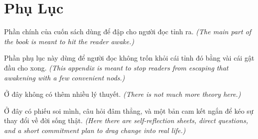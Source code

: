 \chapter*{Phụ Lục}

\begin{tcolorbox}[colback=booksoft!45,colframe=booksecondary,arc=4pt,boxrule=0.6pt,title={\bfseries Phụ Lục Này Dùng Để Làm Gì?},fonttitle=\bfseries\color{booksecondary}]
Phần chính của cuốn sách dùng để đập cho người đọc tỉnh ra.
\textit{(The main part of the book is meant to hit the reader awake.)}

Phần phụ lục này dùng để người đọc không trốn khỏi cái tỉnh đó bằng vài cái gật đầu cho xong.
\textit{(This appendix is meant to stop readers from escaping that awakening with a few convenient nods.)}

Ở đây không có thêm nhiều lý thuyết.
\textit{(There is not much more theory here.)}

Ở đây có phiếu soi mình, câu hỏi đâm thẳng, và một bản cam kết ngắn để kéo sự thay đổi về đời sống thật.
\textit{(Here there are self-reflection sheets, direct questions, and a short commitment plan to drag change into real life.)}
\end{tcolorbox}

\ngancach